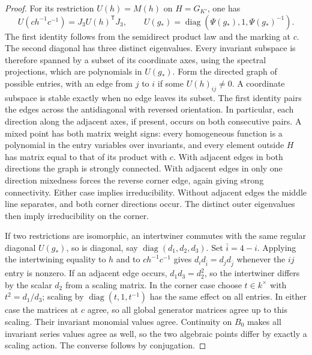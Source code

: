 \documentclass[a4paper,11pt]{article}
\theoremstyle{definition}
\theoremstyle{remark}
\numberwithin{equation}{section}
\begin{document}
\begin{proof}
For its restriction \(U(h)=M(h)\) on \(H=G_{K'}\), one has
\[
 U(c h^{-1}c^{-1})=J_3 U(h)^{\mathsf T}J_3,\qquad
 U(g_*)=\operatorname{diag}(\Psi(g_*),1,\Psi(g_*)^{-1}).
\]
The first identity follows from the semidirect product law and the marking at \(c\). The second diagonal has three distinct eigenvalues. Every invariant subspace is therefore spanned by a subset of its coordinate axes, using the spectral projections, which are polynomials in \(U(g_*)\). Form the directed graph of possible entries, with an edge from \(j\) to \(i\) if some \(U(h)_{ij}\ne0\). A coordinate subspace is stable exactly when no edge leaves its subset. The first identity pairs the edges across the antidiagonal with reversed orientation. In particular, each direction along the adjacent axes, if present, occurs on both consecutive pairs. A mixed point has both matrix weight signs: every homogeneous function is a polynomial in the entry variables over invariants, and every element outside \(H\) has matrix equal to that of its product with \(c\). With adjacent edges in both directions the graph is strongly connected. With adjacent edges in only one direction mixedness forces the reverse corner edge, again giving strong connectivity. Either case implies irreducibility. Without adjacent edges the middle line separates, and both corner directions occur. The distinct outer eigenvalues then imply irreducibility on the corner.

If two restrictions are isomorphic, an intertwiner commutes with the same regular diagonal \(U(g_*)\), so is diagonal, say \(\operatorname{diag}(d_1,d_2,d_3)\). Set \(\bar i=4-i\). Applying the intertwining equality to \(h\) and to \(ch^{-1}c^{-1}\) gives \(d_i d_{\bar i}=d_j d_{\bar j}\) whenever the \(ij\) entry is nonzero. If an adjacent edge occurs, \(d_1d_3=d_2^2\), so the intertwiner differs by the scalar \(d_2\) from a scaling matrix. In the corner case choose \(t\in k^\times\) with \(t^2=d_1/d_3\); scaling by \(\operatorname{diag}(t,1,t^{-1})\) has the same effect on all entries. In either case the matrices at \(c\) agree, so all global generator matrices agree up to this scaling. Their invariant monomial values agree. Continuity on \(B_0\) makes all invariant series values agree as well, so the two algebraic points differ by exactly a scaling action. The converse follows by conjugation.
\end{proof}
\end{document}
